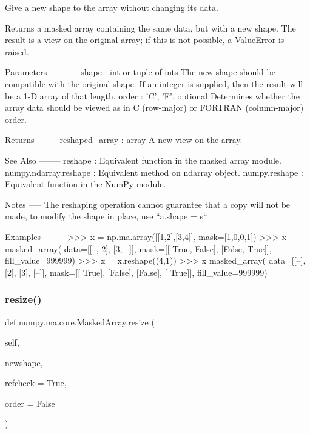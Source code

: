\begin{DoxyVerb}Give a new shape to the array without changing its data.

Returns a masked array containing the same data, but with a new shape.
The result is a view on the original array; if this is not possible, a
ValueError is raised.

Parameters
----------
shape : int or tuple of ints
    The new shape should be compatible with the original shape. If an
    integer is supplied, then the result will be a 1-D array of that
    length.
order : {'C', 'F'}, optional
    Determines whether the array data should be viewed as in C
    (row-major) or FORTRAN (column-major) order.

Returns
-------
reshaped_array : array
    A new view on the array.

See Also
--------
reshape : Equivalent function in the masked array module.
numpy.ndarray.reshape : Equivalent method on ndarray object.
numpy.reshape : Equivalent function in the NumPy module.

Notes
-----
The reshaping operation cannot guarantee that a copy will not be made,
to modify the shape in place, use ``a.shape = s``

Examples
--------
>>> x = np.ma.array([[1,2],[3,4]], mask=[1,0,0,1])
>>> x
masked_array(
  data=[[--, 2],
[3, --]],
  mask=[[ True, False],
[False,  True]],
  fill_value=999999)
>>> x = x.reshape((4,1))
>>> x
masked_array(
  data=[[--],
[2],
[3],
[--]],
  mask=[[ True],
[False],
[False],
[ True]],
  fill_value=999999)\end{DoxyVerb}
 \mbox{\label{classnumpy_1_1ma_1_1core_1_1MaskedArray_a53c8d5d7876eab18234444902715cee5}} 
\subsubsection{\texorpdfstring{resize()}{resize()}}
{\footnotesize\ttfamily def numpy.\+ma.\+core.\+Masked\+Array.\+resize (\begin{DoxyParamCaption}\item[{}]{self,  }\item[{}]{newshape,  }\item[{}]{refcheck = {\ttfamily True},  }\item[{}]{order = {\ttfamily False} }\end{DoxyParamCaption})}


